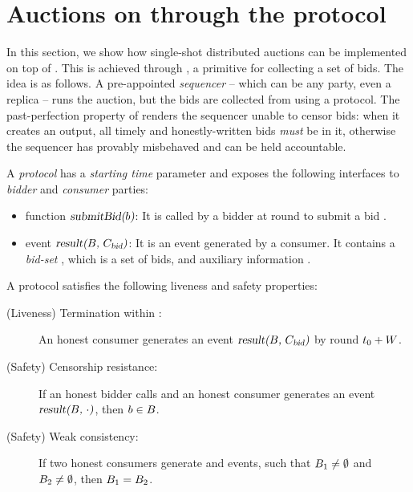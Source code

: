 \section{Auctions on \podtm through the \bidsettm protocol}\label{sec:auctions}
In this section, we show how single-shot distributed auctions can be implemented on top of \podtm.
This is achieved through \bidsettm, a primitive for collecting a set of bids.
The idea is as follows. A pre-appointed \emph{sequencer} -- which can be any party, even a \podtm replica -- runs the auction, but the bids are collected from \podtm using a \bidsettm protocol. The past-perfection property of \podtm renders the sequencer unable to censor bids: when it creates an output, all timely and honestly-written bids \emph{must} be in it, otherwise the sequencer has provably misbehaved and can be held accountable.


\begin{definition}\label{def:auction-framework}
    A \bidsettm \emph{protocol} has a \emph{starting time} parameter \tzero and exposes the following interfaces to \emph{bidder} and \emph{consumer} parties:
    \begin{itemize}
        \item function $\textsl{submitBid(\ensuremath{b})}$: It is called by a bidder at round \tzero to submit a bid \bid.
        \item event $\textsl{result(\ensuremath{B}, \ensuremath{C_\text{bid}})}$: It is an event generated by a consumer. It contains a \emph{bid-set} \bag, which is a set of bids, and auxiliary information \bidcert.
    \end{itemize}
\end{definition}


A \bidsettm protocol satisfies the following liveness and safety properties:
\begin{description}
    \item[(Liveness) Termination within \parAuctionTerm:]
    An honest consumer generates an event $\textsl{result(\ensuremath{B}, \ensuremath{C_\text{bid}})}$ by round $t_0 + W$.

    \item [(Safety) Censorship resistance:]
    If an honest bidder calls \opSubmitBid{\bid}
    and an honest consumer generates an event $\textsl{result(\ensuremath{B}, $\cdot$)}$,
    then $b \in B$.

    \item[(Safety) Weak consistency:]
    If two honest consumers generate  and  events, such that $B_1 \neq \emptyset$ and $B_2 \neq \emptyset$, then $B_1 = B_2$.

\end{description}

